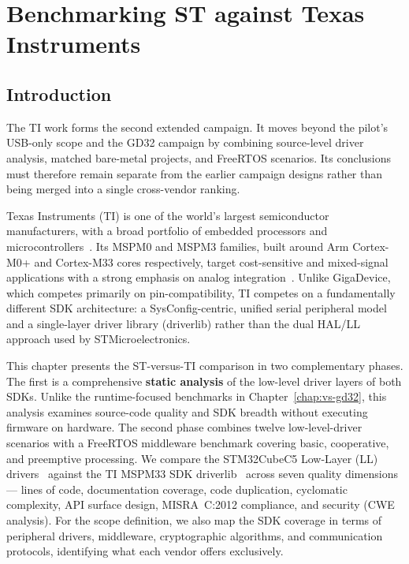 \chapter{Benchmarking ST against Texas Instruments}
\label{chap:vs-ti}

\section*{Introduction}

The TI work forms the second extended campaign. It moves beyond the pilot's USB-only scope
and the GD32 campaign by combining source-level driver analysis, matched bare-metal
projects, and FreeRTOS scenarios. Its conclusions must therefore remain separate from the
earlier campaign designs rather than being merged into a single cross-vendor ranking.

Texas Instruments (TI) is one of the world's largest semiconductor manufacturers, with a
broad portfolio of embedded processors and microcontrollers~\cite{ti-about}. Its MSPM0 and
MSPM3 families, built around Arm Cortex-M0+ and Cortex-M33 cores respectively, target
cost-sensitive and mixed-signal applications with a strong emphasis on analog
integration~\cite{ti-mspm33-product}. Unlike GigaDevice, which competes primarily on
pin-compatibility, TI competes on a fundamentally different SDK architecture: a
SysConfig-centric, unified serial peripheral model and a single-layer driver library
(driverlib) rather than the dual HAL/LL approach used by STMicroelectronics.

This chapter presents the ST-versus-TI comparison in two complementary phases. The first is a
comprehensive \textbf{static analysis} of the low-level driver layers of both SDKs. Unlike the
runtime-focused benchmarks in Chapter~\ref{chap:vs-gd32}, this analysis examines source-code
quality and SDK breadth without executing firmware on hardware. The second phase combines
twelve low-level-driver scenarios with a FreeRTOS middleware benchmark covering basic,
cooperative, and preemptive processing. We compare the
STM32CubeC5 Low-Layer (LL) drivers~\cite{stm32cubec5-sw} against the TI MSPM33 SDK
driverlib~\cite{ti-mspm33-sdk} across seven quality dimensions --- lines of code,
documentation coverage, code duplication, cyclomatic complexity, API surface design,
MISRA~C:2012 compliance, and security (CWE analysis). For the scope definition, we also
map the SDK coverage in terms of peripheral drivers, middleware, cryptographic algorithms,
and communication protocols, identifying what each vendor offers exclusively.

